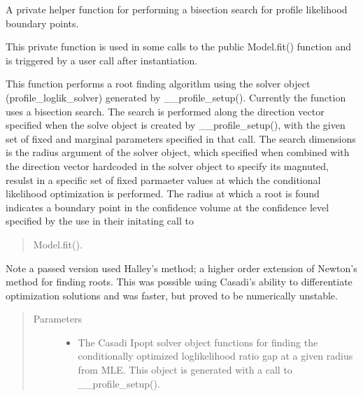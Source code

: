 \documentclass[letterpaper,10pt,english,openany,oneside]{sphinxmanual}
\begin{document}
\begin{fulllineitems}

\begin{fulllineitems}
\label{\detokenize{nloed:nloed.model.Model.__logliksearch}}
A private helper function for performing a bisection search for profile likelihood
boundary points.

This private function is used in some calls to the public Model.fit() function and is
triggered by a user call after instantiation.

This function performs a root finding algorithm using the solver object  (profile\_loglik\_solver)
generated by \_\_profile\_setup(). Currently the function uses a bisection search. The search
is performed along the direction vector specified when the solve object is created by
\_\_profile\_setup(), with the given set of fixed and marginal parameters specified in that
call. The search dimensions is the radius argument of the solver object, which specified when
combined with the direction vector hard\sphinxhyphen{}coded in the solver object to specify its magnuted,
resulst in a specific set of fixed parmaeter values at which the conditional likelihood
optimization is performed. The radius at which a root is found indicates a boundary point in
the confidence volume at the confidence level specified by the use in their initating call to
\begin{quote}

Model.fit().
\end{quote}

Note a passed version used Halley’s method; a higher order extension of Newton’s method for
finding roots. This was possible using Casadi’s ability to differentiate optimization solutions
and was faster, but proved to be numerically unstable.
\begin{quote}\begin{description}
\item[{Parameters}] \leavevmode\begin{itemize}
\item {} 
 \textendash{} The Casadi Ipopt solver object functions for finding the conditionally
optimized loglikelihood ratio gap at a given radius from MLE. This object is generated
with a call to \_\_profile\_setup().


\end{itemize}
\end{description}
\end{quote}
\end{fulllineitems}
\end{fulllineitems}
\end{document}
